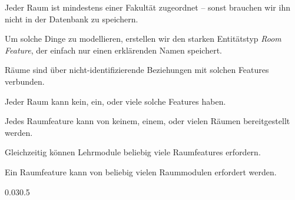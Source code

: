 \documentclass[aspectratio=169,mathserif,notheorems]{beamer}%
\begin{document}
\begin{frame}
{{\begin{itemize}
{\item<16-> Jeder Raum ist mindestens einer Fakultät zugeordnet -- sonst brauchen wir ihn nicht in der Datenbank zu speichern.%
}%
%
%
%
%
%
%
%
%
%
%
%
\item<22-> Um solche Dinge zu modellieren, erstellen wir den starken Entitätstyp \emph{Room Feature}, der einfach nur einen erklärenden Namen speichert.%
%
\item<23-> Räume sind über nicht-identifizierende Beziehungen mit solchen Features verbunden.%
%
\item<24-> Jeder Raum kann kein, ein, oder viele solche Features haben.%
%
\item<25-> Jedes Raumfeature kann von keinem, einem, oder vielen Räumen bereitgestellt werden.%
%
\item<26-> Gleichzeitig können Lehrmodule beliebig viele Raumfeatures erfordern.%
%
\item<27-> Ein Raumfeature kann von beliebig vielen Raummodulen erfordert werden.%
\end{itemize}%
}}{0.03}{0.5}%
\end{frame}%
%
\end{document}
